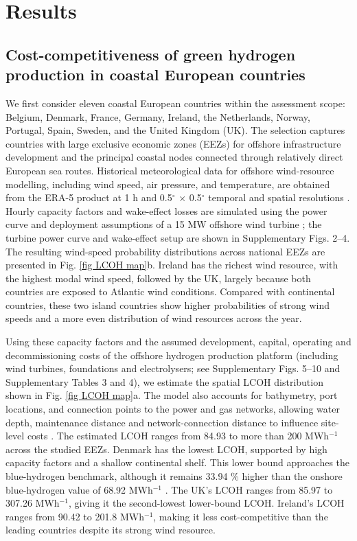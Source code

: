 \documentclass[pdflatex,sn-mathphys,Numbered]{sn-jnl}%
\begin{document}
\section{Results}

\subsection{Cost-competitiveness of green hydrogen production in coastal European countries}

We first consider eleven coastal European countries within the assessment scope: Belgium, Denmark, France, Germany, Ireland, the Netherlands, Norway, Portugal, Spain, Sweden, and the United Kingdom (UK). The selection captures countries with large exclusive economic zones (EEZs) for offshore infrastructure development and the principal coastal nodes connected through relatively direct European sea routes. Historical meteorological data for offshore wind-resource modelling, including wind speed, air pressure, and temperature, are obtained from the ERA-5 product at 1 h and 0.5$^\circ$ $\times$ 0.5$^\circ$ temporal and spatial resolutions \cite{ERA5}. Hourly capacity factors and wake-effect losses are simulated using the power curve and deployment assumptions of a 15 MW offshore wind turbine \cite{musial2019oregon}; the turbine power curve and wake-effect setup are shown in Supplementary Figs. 2--4. The resulting wind-speed probability distributions across national EEZs are presented in Fig. \ref{fig LCOH map}b. Ireland has the richest wind resource, with the highest modal wind speed, followed by the UK, largely because both countries are exposed to Atlantic wind conditions. Compared with continental countries, these two island countries show higher probabilities of strong wind speeds and a more even distribution of wind resources across the year.

Using these capacity factors and the assumed development, capital, operating and decommissioning costs of the offshore hydrogen production platform (including wind turbines, foundations and electrolysers; see Supplementary Figs. 5--10 and Supplementary Tables 3 and 4), we estimate the spatial LCOH distribution shown in Fig. \ref{fig LCOH map}a. The model also accounts for bathymetry, port locations, and connection points to the power and gas networks, allowing water depth, maintenance distance and network-connection distance to influence site-level costs \cite{bathymetry_2022, EMODnet}. The estimated LCOH ranges from 84.93 to more than 200 \texteuro{} MWh$^{-1}$ across the studied EEZs. Denmark has the lowest LCOH, supported by high capacity factors and a shallow continental shelf. This lower bound approaches the blue-hydrogen benchmark, although it remains 33.94 \% higher than the onshore blue-hydrogen value of 68.92 \texteuro{} MWh$^{-1}$ \cite{Globalaveragelevelised}. The UK's LCOH ranges from 85.97 to 307.26 \texteuro{} MWh$^{-1}$, giving it the second-lowest lower-bound LCOH. Ireland's LCOH ranges from 90.42 to 201.8 \texteuro{} MWh$^{-1}$, making it less cost-competitive than the leading countries despite its strong wind resource.
\end{document}
